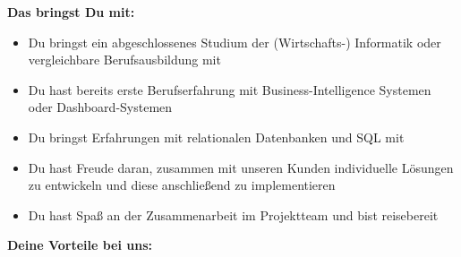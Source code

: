 \documentclass[12pt,utf8]{scrartcl}
\begin{document}
\begin{flushleft}
\textbf{Das bringst Du mit:}
\begin{center}
	\begin{itemize}
		\item Du bringst ein abgeschlossenes Studium der (Wirtschafts-) Informatik oder vergleichbare Berufsausbildung mit
		\item Du hast bereits erste Berufserfahrung mit Business-Intelligence Systemen oder Dashboard-Systemen
		\item Du bringst Erfahrungen mit relationalen Datenbanken und SQL mit
		\item Du hast Freude daran, zusammen mit unseren Kunden individuelle Lösungen zu entwickeln und diese anschließend zu implementieren
		\item Du hast Spaß an der Zusammenarbeit im Projektteam und bist reisebereit
	\end{itemize}
\end{center}

\begin{center}
	\textbf{Deine Vorteile bei uns:}
\end{center}


\end{flushleft}
\end{document}
